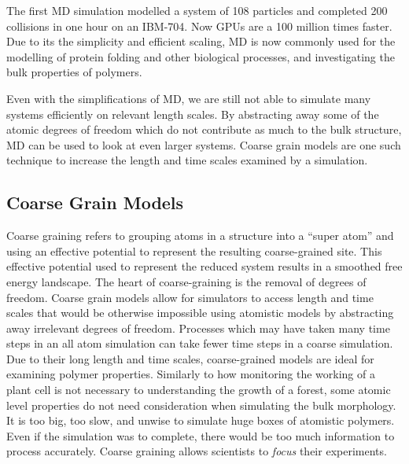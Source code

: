 The first MD simulation modelled a system of 108 particles and completed 200 collisions in one hour on an IBM-704\cite{Alder1957}.
Now GPUs are a 100 million times faster.
Due to its the simplicity and efficient scaling, MD is now commonly used for the modelling of protein folding\cite{levitt75} and other biological processes, and investigating the bulk properties of polymers\cite{Gartner2019a}.


Even with the simplifications of MD, we are still not able to simulate many systems efficiently on relevant length scales.
By abstracting away some of the atomic degrees of freedom which do not contribute as much to the bulk structure, MD can be used to look at even larger systems.
Coarse grain models are one such technique to increase the length and time scales examined by a simulation.

\subsection*{Coarse Grain Models}

Coarse graining refers to grouping atoms in a structure into a ``super atom'' and using an effective potential to represent the resulting coarse-grained site.
This effective potential used to represent the reduced system results in a smoothed free energy landscape. 
The heart of coarse-graining is the removal of degrees of freedom. 
Coarse grain models allow for simulators to access length and time scales that would be otherwise impossible using atomistic models by abstracting away irrelevant degrees of freedom.
Processes which may have taken many time steps in an all atom simulation can take fewer time steps in a coarse simulation\cite{Berendsen2010}.
Due to their long length and time scales, coarse-grained models are ideal for examining polymer properties\cite{Gartner2019a}.
Similarly to how monitoring the working of a plant cell is not necessary to understanding the growth of a forest, some atomic level properties do not need consideration when simulating the bulk morphology\cite{Muller-Plathe2002}.
It is too big, too slow, and unwise to simulate huge boxes of atomistic polymers.
Even if the simulation was to complete, there would be too much information to process accurately. 
Coarse graining allows scientists to \textit{focus} their experiments\cite{Baschnagel2000}.

